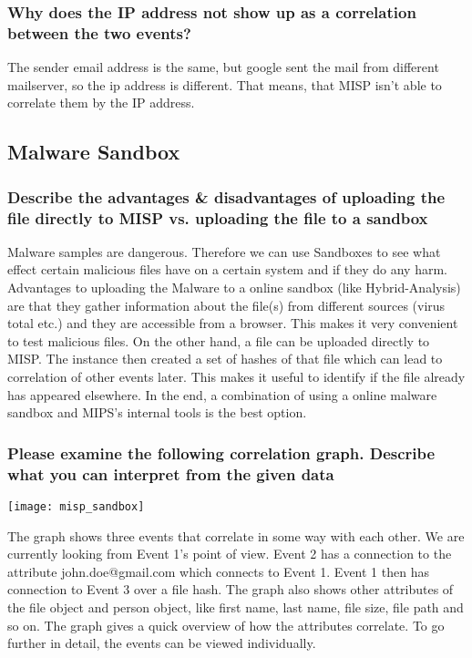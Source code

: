 \subsubsection{Why does the IP address not show up as a correlation between the two events?}
The sender email address is the same, but google sent the mail from different mailserver, so the ip address is different. That means, that MISP isn't able to correlate them by the IP address.

\subsection{Malware Sandbox}

\subsubsection{Describe the advantages \& disadvantages of uploading the file directly to MISP vs. uploading the file to a sandbox}
Malware samples are dangerous. Therefore we can use Sandboxes to see what effect certain malicious files have on a certain system and if they do any harm. Advantages to uploading the Malware to a online sandbox (like Hybrid-Analysis) are that they gather information about the file(s) from different sources (virus total etc.) and they are accessible from a browser. This makes it very convenient to test malicious files.
On the other hand, a file can be uploaded directly to MISP. The instance then created a set of hashes of that file which can lead to correlation of other events later. This makes it useful to identify if the file already has appeared elsewhere.
In the end, a combination of using a online malware sandbox and MIPS's internal tools is the best option.

\subsubsection{Please examine the following correlation graph. Describe what you can interpret from the given data}
\begin{center}
    \texttt{[image: misp\_sandbox]}
    \vspace{-8pt}
\end{center}

The graph shows three events that correlate in some way with each other. We are currently looking from Event 1's point of view. Event 2 has a connection to the attribute john.doe@gmail.com which connects to Event 1. Event 1 then has connection to Event 3 over a file hash.
The graph also shows other attributes of the file object and person object, like first name, last name, file size, file path and so on.
The graph gives a quick overview of how the attributes correlate. To go further in detail, the events can be viewed individually.

